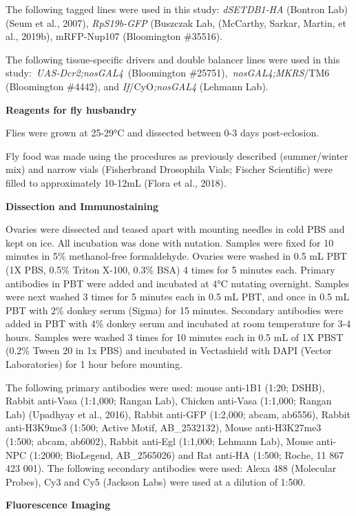 \documentclass[12pt,oneside]{reedthesis}
\begin{document}
The following tagged lines were used in this study: \emph{dSETDB1-HA}
(Bontron Lab) (Seum et al., 2007), \emph{RpS19b-GFP}
(Buszczak Lab, (McCarthy, Sarkar, Martin, et al., 2019b),
mRFP-Nup107 (Bloomington \#35516).

The following tissue-specific drivers and double balancer lines were
used in this study:~\emph{UAS-Dcr2;nosGAL4}~(Bloomington
\#25751),~\emph{nosGAL4;MKRS}/TM6 (Bloomington \#4442), and
\emph{If}/CyO\emph{;nosGAL4} (Lehmann Lab).

\textbf{Reagents for fly husbandry}

Flies were grown at 25-29°C and dissected between 0-3 days
post-eclosion.

Fly food was made using the procedures as previously described
(summer/winter mix) and narrow vials (Fisherbrand Drosophila Vials;
Fischer Scientific) were filled to approximately 10-12mL
(Flora et al., 2018).

\textbf{Dissection and Immunostaining}

Ovaries were dissected and teased apart with mounting needles in cold
PBS and kept on ice. All incubation was done with nutation. Samples were
fixed for 10 minutes in 5\% methanol-free formaldehyde. Ovaries were
washed in 0.5 mL PBT (1X PBS, 0.5\% Triton X-100, 0.3\% BSA) 4 times for 5
minutes each. Primary antibodies in PBT were added and incubated at 4°C
nutating overnight. Samples were next washed 3 times for 5 minutes each
in 0.5 mL PBT, and once in 0.5 mL PBT with 2\% donkey serum (Sigma) for
15 minutes. Secondary antibodies were added in PBT with 4\% donkey serum
and incubated at room temperature for 3-4 hours. Samples were washed 3
times for 10 minutes each in 0.5 mL of 1X PBST (0.2\% Tween 20 in 1x PBS)
and incubated in Vectashield with DAPI (Vector Laboratories) for 1 hour
before mounting.

The following primary antibodies were used: mouse anti-1B1 (1:20; DSHB),
Rabbit anti-Vasa (1:1,000; Rangan Lab), Chicken anti-Vasa (1:1,000;
Rangan Lab) (Upadhyay et al., 2016), Rabbit anti-GFP (1:2,000; abcam,
ab6556), Rabbit anti-H3K9me3 (1:500; Active Motif, AB\_2532132), Mouse
anti-H3K27me3 (1:500; abcam, ab6002), Rabbit anti-Egl (1:1,000; Lehmann
Lab), Mouse anti-NPC (1:2000; BioLegend, AB\_2565026) and Rat anti-HA
(1:500; Roche, 11 867 423 001). The following secondary antibodies were
used: Alexa 488 (Molecular Probes), Cy3 and Cy5 (Jackson Labs) were used
at a dilution of 1:500.

\textbf{Fluorescence Imaging}
\end{document}
